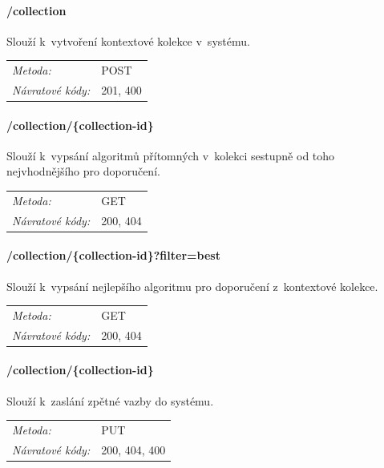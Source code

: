 \documentclass[thesis=M,czech]{FITthesis}[2014/05/07]
\begin{document}
\paragraph*{/collection}

Slouží k~vytvoření kontextové kolekce v~systému.

\begin{center}
 	\begin{tabular}{lp{10cm}}
 		\textit{Metoda:}		& POST			\tabularnewline 
 		\textit{Návratové kódy:}		& 201, 400			\tabularnewline 		
 	\end{tabular}	
\end{center} 

\paragraph*{/collection/\{collection-id\}}

Slouží k~vypsání algoritmů přítomných v~kolekci sestupně od toho nejvhodnějšího pro doporučení.

\begin{center}
 	\begin{tabular}{lp{10cm}}
 		\textit{Metoda:}		& GET			\tabularnewline 
 		\textit{Návratové kódy:}		& 200, 404			\tabularnewline 		
 	\end{tabular}	
\end{center} 

\paragraph*{/collection/\{collection-id\}?filter=best}

Slouží k~vypsání nejlepšího algoritmu pro doporučení z~kontextové kolekce.

\begin{center}
 	\begin{tabular}{lp{10cm}}
 		\textit{Metoda:}		& GET			\tabularnewline 
 		\textit{Návratové kódy:}		& 200, 404			\tabularnewline 		
 	\end{tabular}	
\end{center} 

\paragraph*{/collection/\{collection-id\}}

Slouží k~zaslání zpětné vazby do systému.

\begin{center}
 	\begin{tabular}{lp{10cm}}
 		\textit{Metoda:}		& PUT			\tabularnewline 
 		\textit{Návratové kódy:}		& 200, 404, 400			\tabularnewline 		
 	\end{tabular}	
\end{center} 
\end{document}
